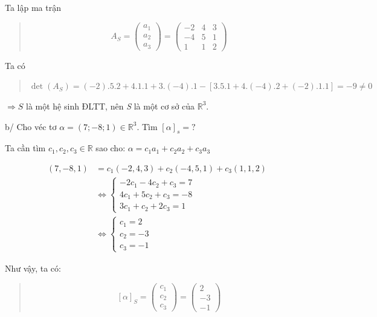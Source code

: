 \documentclass[12pt,a4paper]{article}
\begin{document}
Ta lập ma trận

\begin{quote}
\[A_S = \begin{pmatrix} a_1 \\ a_2 \\ a_3 \end{pmatrix} = \begin{pmatrix} -2 & 4 & 3 \\ -4 & 5 & 1 \\ 1 & 1 & 2 \end{pmatrix}\]
\end{quote}

Ta có

\begin{quote}
$\det(A_S) = (-2).5.2 + 4.1.1 + 3.(-4).1 - [3.5.1 + 4.(-4).2 + (-2).1.1] = -9 \ne 0$
\end{quote}

$\Rightarrow S$ là một hệ sinh ĐLTT,
nên \emph{S} là một cơ sở của
$\mathbb{R}^3$.

b/ Cho véc tơ $\alpha = (7; -8; 1) \in \mathbb{R}^3$. Tìm
$[\alpha]_s =?$

Ta cần tìm $c_1, c_2, c_3 \in \mathbb{R}$ sao cho:
$\alpha = c_1a_1 + c_2a_2 + c_3a_3$

\begin{align*}
(7, -8, 1) &= c_1(-2, 4, 3) + c_2(-4, 5, 1) + c_3(1, 1, 2) \\
&\Leftrightarrow \begin{cases} -2c_1 - 4c_2 + c_3 = 7 \\ 4c_1 + 5c_2 + c_3 = -8 \\ 3c_1 + c_2 + 2c_3 = 1 \end{cases} \\
&\Leftrightarrow \begin{cases} c_1 = 2 \\ c_2 = -3 \\ c_3 = -1 \end{cases}
\end{align*}

Như vậy, ta có:

\begin{quote}
\[[\alpha]_S = \begin{pmatrix} c_1 \\ c_2 \\ c_3 \end{pmatrix} = \begin{pmatrix} 2 \\ -3 \\ -1 \end{pmatrix}\]
\end{quote}
\end{document}
